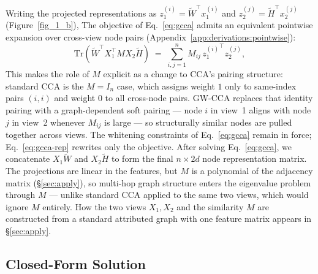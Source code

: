 \documentclass{article}
\begin{document}
Writing the projected representations as
$z_1^{(i)} = \widetilde{W}^\top x_1^{(i)}$ and
$z_2^{(j)} = \widetilde{H}^\top x_2^{(j)}$ (Figure~\ref{fig_1_b}),
The objective of Eq.~\ref{eq:gcca} admits an equivalent pointwise
expansion over cross-view node pairs (Appendix~\ref{app:derivations:pointwise}):
\begin{equation}\label{eq:gcca-rep}
\mathrm{Tr}\!\left(\widetilde{W}^\top X_1^\top M X_2 \widetilde{H}\right)
\;=\; \sum_{i,j=1}^{n} M_{ij}\, {z_1^{(i)}}^\top z_2^{(j)},
\end{equation}
This makes the role of $M$ explicit as a change to CCA's pairing structure:
standard CCA is the $M = I_n$ case, which assigns weight $1$ only to
same-index pairs $(i, i)$ and weight $0$ to all cross-node pairs. GW-CCA
replaces that identity pairing with a graph-dependent soft pairing --- node
$i$ in view~1 aligns with node $j$ in view~2 whenever $M_{ij}$ is large ---
so structurally similar nodes are pulled together across views. The
whitening constraints of Eq.~\ref{eq:gcca} remain in force;
Eq.~\ref{eq:gcca-rep} rewrites only the objective. After solving
Eq.~\ref{eq:gcca}, we concatenate $X_1 \widetilde{W}$ and
$X_2 \widetilde{H}$ to form the final $n \times 2d$ node representation
matrix. The projections are linear in the features, but $M$ is a
polynomial of the adjacency matrix (\S\ref{sec:apply}), so multi-hop graph
structure enters the eigenvalue problem through $M$ --- unlike standard CCA
applied to the same two views, which would ignore $M$ entirely. How the
two views $X_1, X_2$ and the similarity $M$ are constructed from a
standard attributed graph with one feature matrix appears in
\S\ref{sec:apply}.

\subsection{Closed-Form Solution}
\label{sec:approach:solution}
\end{document}
